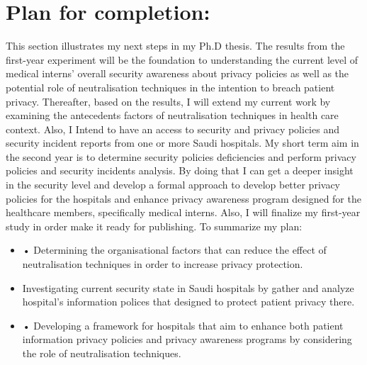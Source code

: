 \section{Plan for completion:}
This section illustrates my next steps in my Ph.D thesis. The results from the first-year experiment will be the foundation to understanding the current level of medical interns' overall security awareness about privacy policies as well as the potential role of neutralisation techniques in the intention to breach patient privacy. Thereafter, based on the results, I will extend my current work by examining the antecedents factors of neutralisation techniques in health care context.  Also, I Intend to have an access to security and privacy policies and security incident reports from one or more Saudi hospitals. My short term aim in the second year is to determine security policies deficiencies and perform privacy policies and security incidents analysis. By doing that I can get a deeper insight in the security level and develop a formal approach to develop better privacy policies for the hospitals and enhance privacy awareness program designed for the healthcare members, specifically medical interns. Also, I will finalize my first-year study in order make it ready for publishing. To summarize my plan:
\begin{itemize}
	\item •	Determining the organisational factors that can reduce the effect of neutralisation techniques in order to increase privacy protection.
	 \item Investigating current security state in Saudi hospitals by gather and analyze hospital's information polices that designed to protect patient privacy there.
	 \item •	Developing a framework for hospitals that aim to enhance both patient information privacy policies and privacy awareness programs by considering the role of neutralisation techniques.
\end{itemize}
